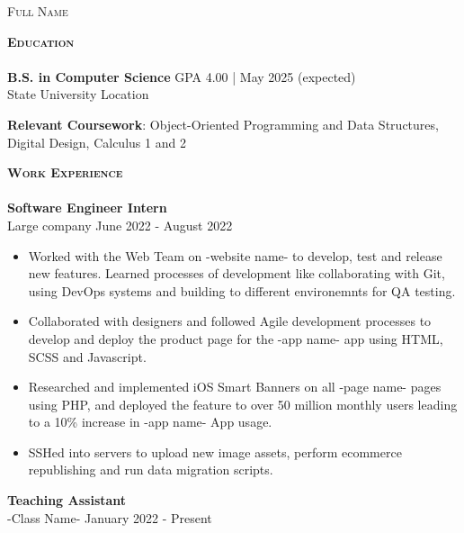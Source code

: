 \documentclass[10pt, a4paper]{article}
\newcommand{\lineunder} {
    \vspace*{-8pt} \\
    \hspace*{-18pt} \hrulefill \\
}
\newcommand{\header} [1] {
    {\hspace*{-15pt}\vspace*{3pt} \textsc{#1}}
    \vspace*{-6pt} \lineunder
}
\begin{document}
{\begin{center}
    
	{\Huge \scshape {Full Name}}\\
	\vspace{2mm}
	
\end{center}



    \header{\textbf{Education}}

    \textbf{B.S. in Computer Science} \hfill GPA 4.00 | May 2025 (expected)
\\ State University \hfill Location

\textbf{Relevant Coursework}: Object-Oriented Programming and Data Structures, Digital Design, Calculus 1 and 2 \\


\vspace{2mm}




    \header{\textbf{Work Experience}}
    \textbf{Software Engineer Intern } \\ 
    Large company     \hfill June 2022 - August 2022\\
    \vspace{-2mm}
\begin{itemize}
    \itemsep-0.05em
    \item Worked with the Web Team on -website name- to develop, test and release new features. Learned processes of development like collaborating with Git, using DevOps systems and building to different environemnts for QA testing.
    \item Collaborated with designers and followed Agile development processes to develop and deploy the product page for the -app name- app using HTML, SCSS and Javascript. 
    \item Researched and implemented iOS Smart Banners on all -page name- pages using PHP, and deployed the feature to over 50 million monthly users leading to a 10\% increase in -app name- App usage. 
    \item SSHed into servers to upload new image assets, perform ecommerce republishing and run data migration scripts. 
\end{itemize}

    \textbf{Teaching Assistant } \\ -Class Name- \hfill January 2022 - Present\\
      
}
\end{document}
